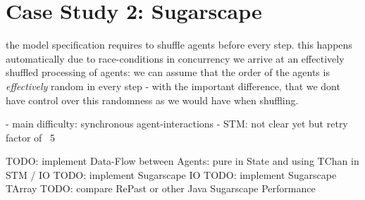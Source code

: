 \section{Case Study 2: Sugarscape}
the model specification requires to shuffle agents before every step. this happens automatically due to race-conditions in concurrency we arrive at an effectively shuffled processing of agents: we can assume that the order of the agents is \textit{effectively} random in every step - with the important difference, that we dont have control over this randomness as we would have when shuffling.

- main difficulty: synchronous agent-interactions
- STM: not clear yet but retry factor of ~5

TODO: implement Data-Flow between Agents: pure in State and using TChan in STM / IO
TODO: implement Sugarscape IO
TODO: implement Sugarscape TArray
TODO: compare RePast or other Java Sugarscape Performance

